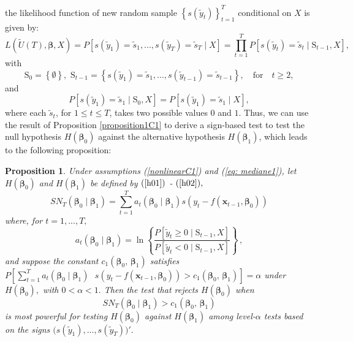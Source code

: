 \documentclass[harvard,11pt]{article}
\newtheorem{proposition}{Proposition}
\begin{document}
the likelihood function of new random sample $\left\{ s(\tilde{y}_{t})\right\}
_{t=1}^{T}$ conditional on $X$ is given by:%
\begin{equation*}
L\left( \tilde{U}(T),\bm{\beta}, X \right) =P\left[ s(\tilde{y}%
_{1})=\tilde{s}_{1},...,s(\tilde{y}_{T})=\tilde{s}_{T}\mid X\right] =\prod\limits_{t=1}^{T} P\left[ s(\tilde{y}_{t})=\tilde{s}_{t}\mid 
\text{\~{S}}_{t-1},X\right] ,
\end{equation*}%
with 
\begin{equation*}
\text{\~{S}}_{0}=\left\{ \emptyset \right\} ,\text{\ \~{S}}_{t-1}=\left\{
s(\tilde{y}_{1})=\tilde{s}_{1},...,s(\tilde{y}_{t-1})=\tilde{s}%
_{t-1}\right\} ,\quad\text{for}\quad t\geq 2,
\end{equation*}%
and%
\begin{equation*}
P\left[ s(\tilde{y}_{1})=\tilde{s}_{1}\mid \text{\~{S}}_{0},X\right] =%
P\left[ s(\tilde{y}_{1})=\tilde{s}_{1}\mid X\right] ,
\end{equation*}%
where each $\tilde{s}_{t}$, for $1\leq t\leq T$, takes two possible values $%
0 $ and $1$. Thus, we can use the result of Proposition \ref{proposition1C1}
to derive a sign-based test to test the null hypothesis $H(\bm{\beta} _{0})$ against
the alternative hypothesis $H(\bm{\beta}_{1})$, which leads to the following proposition:

\begin{proposition}\label{proposition2C1}
Under assumptions (\ref{nonlinearC1}) and (\ref{eq: mediane1}), let $H(\bm{\beta}
_{0})$ and $H(\bm{\beta}_{1})$ be defined by $(\ref{h01})$ - $(\ref{h02}),$%
\begin{equation*}
SN_{T}(\bm{\beta}_{0}\mid\bm{\beta}_{1})=\sum\limits_{t=1}^{T}a_{t}(\bm{\beta}_{0}\mid\bm{\beta}
_{1})s\left( y_{t}-f(\bm{x}_{t-1},\bm{\beta}_{0})\right) 
\end{equation*}%
where, for $t=1,...,T,$%
\begin{equation*}
a_{t}(\bm{\beta}_{0}\mid\bm{\beta}_{1})=\ln \left\{ \frac{P\left[ \tilde{y}%
_{t}\geq 0\mid \text{\~{S}}_{t-1},X\right] }{P\left[ \tilde{y}%
_{t}<0\mid \text{\~{S}}_{t-1},X\right] }\right\} \,,
\end{equation*}%
and suppose the constant $c_{1}(\bm{\beta} _{0},\,\bm{\beta}_{1})$ satisfies $%
P\left[ \sum\limits_{t=1}^{T}a_{t}(\bm{\beta}_{0}\mid\bm{\beta}_{1})\text{ }s\left(
y_{t}-f(\bm{x}_{t-1},\bm{\beta}_{0})\right) >c_{1}(\bm{\beta}_{0},\,\bm{\beta}_{1})\right]
=\alpha $ under $H(\bm{\beta}_{0}),$ with $0<\alpha <1.$ Then the test that
rejects $H(\bm{\beta}_{0})$ when 
\begin{equation*}
SN_{T}(\bm{\beta}_{0}\mid\bm{\beta}_{1})>c_{1}(\bm{\beta}_{0},\,\bm{\beta}_{1})
\end{equation*}%
is most powerful for testing $H(\bm{\beta}_{0})$ against $H(\bm{\beta}_{1})$ among
level-$\alpha $ tests based on the signs $\big(s(\tilde{y}_{1}),...,s(\tilde{y}_{T})\big)'.$
\end{proposition}
\end{document}
